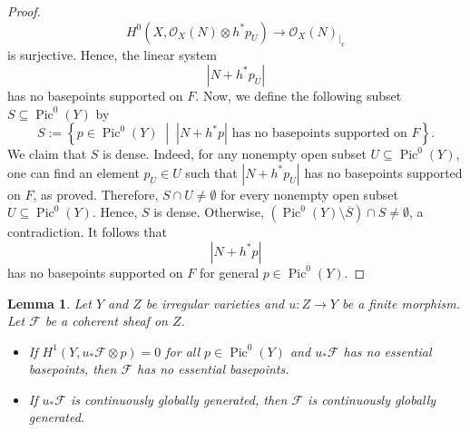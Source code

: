 \documentclass[sn-mathphys-num]{sn-jnl}%
\newtheorem{lemma}[theorem]{Lemma}
\theoremstyle{definition}
\numberwithin{equation}{section}
\begin{document}
\begin{proof}
\begin{equation}\label{se6}
 H^{0}(X, \mathcal{O}_{X}(N) \otimes h^{*}p_{U}) \to \mathcal{O}_{X}(N)_{|_{x}}    
\end{equation}
is surjective. Hence, the linear system $$|N + h^{*}p_{U}|$$ has no  basepoints supported on $F$. Now, we define the following subset $S \subseteq \operatorname{Pic}^{0}(Y)$ by 
\[
S := \left\{ p \in \operatorname{Pic}^{0}(Y) \;\middle|\; |N + h^{*}p| \text{ has no basepoints supported on } F \right\}.\]
We claim that \( S \) is dense. Indeed, for any nonempty open subset \( U \subseteq \operatorname{Pic}^{0}(Y) \), one can find an element \( p_{U} \in U \) such that \( |N + h^{*}p_{U}| \) has no basepoints supported on \( F \), as proved. Therefore, \( S \cap U \neq \emptyset \) for every nonempty open subset 
\( U \subseteq \operatorname{Pic}^{0}(Y) \). Hence, \( S \) is dense. 
Otherwise, \( \left(\operatorname{Pic}^{0}(Y) \setminus \overline{S}\right) \cap S \neq \emptyset \), 
a contradiction. It follows that 
\[
|N + h^{*}p|
\]
has no basepoints supported on \( F \) for general 
\( p \in \operatorname{Pic}^{0}(Y) \).
\end{proof}
\begin{lemma}\label{lemma2}
Let $Y$ and $Z$ be irregular varieties and  $u: Z \to Y$ be a finite morphism. Let $\mathcal{F}$ be a coherent sheaf on $Z$.
\begin{itemize}
    \item [1)] If $H^{1}(Y, u_{*}\mathcal{F} \otimes p) =0$ for all $p \in \operatorname{Pic}^{0}(Y)$ and $u_{*}\mathcal{F}$ has no essential basepoints, then $\mathcal{F}$ has no essential basepoints. \item[2)]  If $u_{*}\mathcal{F}$ is continuously globally generated, then $\mathcal{F}$ is continuously globally generated.
    \end{itemize}
\end{lemma}
\end{document}
